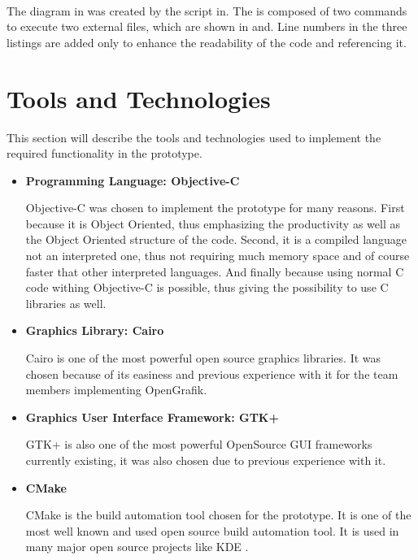 \paragraph{}
The diagram in was created by the script in. The is composed of two commands to execute two external files, which are shown in and. Line numbers in the three listings are added only to enhance the readability of the code and referencing it.


\section{Tools and Technologies}
This section will describe the tools and technologies used to implement the required functionality in the prototype.
\begin{itemize}
\item {\bf Programming Language: Objective-C}
\par \noindent
Objective-C was chosen to implement the prototype for many reasons. First because it is Object Oriented, thus emphasizing the productivity as well as the Object Oriented structure of the code. Second, it is a compiled language not an interpreted one, thus not requiring much memory space and of course faster that other interpreted languages. And finally because using normal C code withing Objective-C is possible, thus giving the possibility to use C libraries as well.

\item {\bf Graphics Library: Cairo}
\par \noindent
Cairo is one of the most powerful open source graphics libraries. It was chosen because of its easiness and previous experience with it for the team members implementing OpenGrafik.

\item {\bf Graphics User Interface Framework: GTK+}
\par \noindent
GTK+ is also one of the most powerful OpenSource GUI frameworks currently existing, it was also chosen due to previous experience with it.

\item {\bf CMake}
\par \noindent
CMake is the build automation tool chosen for the prototype. It is one of the most well known and used open source build automation tool. It is used in many major open source projects like KDE \cite{kde}.
\end{itemize}

